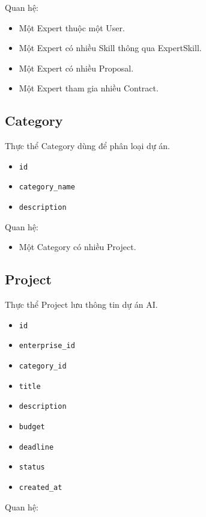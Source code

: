 Quan hệ:

\begin{itemize}
    \item Một Expert thuộc một User.
    \item Một Expert có nhiều Skill thông qua ExpertSkill.
    \item Một Expert có nhiều Proposal.
    \item Một Expert tham gia nhiều Contract.
\end{itemize}

\subsection{Category}

Thực thể Category dùng để phân loại dự án.

\begin{itemize}
    \item \texttt{id}
    \item \texttt{category\_name}
    \item \texttt{description}
\end{itemize}

Quan hệ:

\begin{itemize}
    \item Một Category có nhiều Project.
\end{itemize}

\subsection{Project}

Thực thể Project lưu thông tin dự án AI.

\begin{itemize}
    \item \texttt{id}
    \item \texttt{enterprise\_id}
    \item \texttt{category\_id}
    \item \texttt{title}
    \item \texttt{description}
    \item \texttt{budget}
    \item \texttt{deadline}
    \item \texttt{status}
    \item \texttt{created\_at}
\end{itemize}

Quan hệ:

